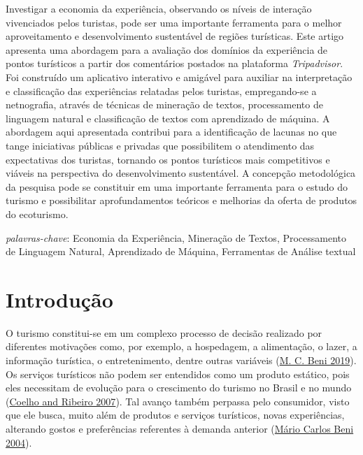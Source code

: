 \documentclass[preprint, 3p,
authoryear]{elsarticle} %
\begin{document}
Investigar a economia da experiência, observando os níveis de interação
vivenciados pelos turistas, pode ser uma importante ferramenta para o
melhor aproveitamento e desenvolvimento sustentável de regiões
turísticas. Este artigo apresenta uma abordagem para a avaliação dos
domínios da experiência de pontos turísticos a partir dos comentários
postados na plataforma \emph{Tripadvisor}. Foi construído um aplicativo
interativo e amigável para auxiliar na interpretação e classificação das
experiências relatadas pelos turistas, empregando-se a netnografia,
através de técnicas de mineração de textos, processamento de linguagem
natural e classificação de textos com aprendizado de máquina. A
abordagem aqui apresentada contribui para a identificação de lacunas no
que tange iniciativas públicas e privadas que possibilitem o atendimento
das expectativas dos turistas, tornando os pontos turísticos mais
competitivos e viáveis na perspectiva do desenvolvimento sustentável. A
concepção metodológica da pesquisa pode se constituir em uma importante
ferramenta para o estudo do turismo e possibilitar aprofundamentos
teóricos e melhorias da oferta de produtos do ecoturismo.

\emph{palavras-chave}: Economia da Experiência, Mineração de Textos,
Processamento de Linguagem Natural, Aprendizado de Máquina, Ferramentas
de Análise textual

\hypertarget{introduuxe7uxe3o}{%
\section{Introdução}\label{introduuxe7uxe3o}}

O turismo constitui-se em um complexo processo de decisão realizado por
diferentes motivações como, por exemplo, a hospedagem, a alimentação, o
lazer, a informação turística, o entretenimento, dentre outras variáveis
(\protect\hyperlink{ref-beni2019}{M. C. Beni 2019}). Os serviços
turísticos não podem ser entendidos como um produto estático, pois eles
necessitam de evolução para o crescimento do turismo no Brasil e no
mundo (\protect\hyperlink{ref-Coelho2007}{Coelho and Ribeiro 2007}). Tal
avanço também perpassa pelo consumidor, visto que ele busca, muito além
de produtos e serviços turísticos, novas experiências, alterando gostos
e preferências referentes à demanda anterior
(\protect\hyperlink{ref-Beni2004}{Mário Carlos Beni 2004}).
\end{document}

